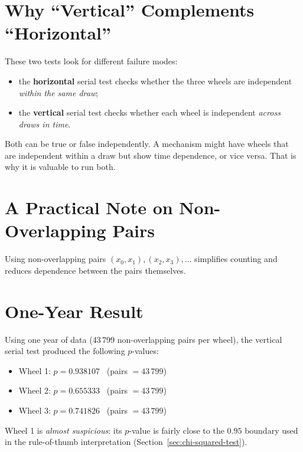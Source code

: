 \section{Why ``Vertical'' Complements ``Horizontal''}
These two tests look for different failure modes:
\begin{itemize}
  \item the \textbf{horizontal} serial test checks whether the three wheels are
        independent \emph{within the same draw};
  \item the \textbf{vertical} serial test checks whether each wheel is
        independent \emph{across draws in time}.
\end{itemize}

Both can be true or false independently.  A mechanism might have wheels that are
independent within a draw but show time dependence, or vice versa.  That is why
it is valuable to run both.

\section{A Practical Note on Non-Overlapping Pairs}
Using non-overlapping pairs \((x_0,x_1),(x_2,x_3),\dots\) simplifies counting
and reduces dependence between the pairs themselves.

\section{One-Year Result}
Using one year of data (43\,799 non-overlapping pairs per wheel), the vertical
serial test produced the following $p$-values:
\begin{itemize}
  \item Wheel 1: \(p = 0.938107\) \ (pairs \(= 43\,799\))
  \item Wheel 2: \(p = 0.655333\) \ (pairs \(= 43\,799\))
  \item Wheel 3: \(p = 0.741826\) \ (pairs \(= 43\,799\))
\end{itemize}

Wheel 1 is \emph{almost suspicious}: its $p$-value is fairly close to the
\(0.95\) boundary used in the rule-of-thumb interpretation
(Section~\ref{sec:chi-squared-test}).